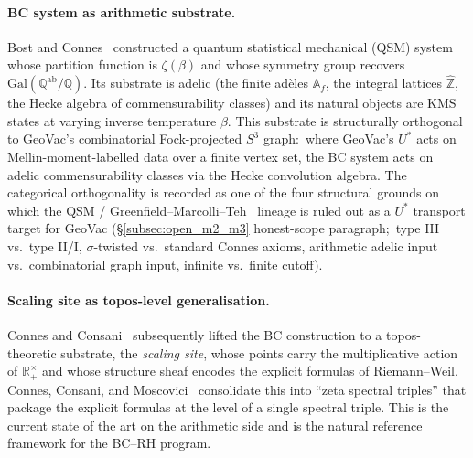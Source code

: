 \documentclass[11pt,a4paper]{article}
\theoremstyle{plain}
\theoremstyle{definition}
\newcommand{\sthree}{S^{3}}
\begin{document}
\paragraph{BC system as arithmetic substrate.}
Bost and Connes~\cite{bost_connes1995} constructed a quantum
statistical mechanical (QSM) system whose partition function is
$\zeta(\beta)$ and whose symmetry group recovers
$\mathrm{Gal}(\mathbb{Q}^{\mathrm{ab}}/\mathbb{Q})$.  Its substrate is
adelic (the finite ad\`eles $\mathbb{A}_f$, the integral lattices
$\widehat{\mathbb{Z}}$, the Hecke algebra of commensurability classes)
and its natural objects are KMS states at varying inverse temperature
$\beta$.  This substrate is structurally orthogonal to GeoVac's
combinatorial Fock-projected $\sthree$ graph:\ where GeoVac's $U^*$
acts on Mellin-moment-labelled data over a finite vertex set, the BC
system acts on adelic commensurability classes via the Hecke
convolution algebra.  The categorical orthogonality is recorded as
one of the four structural grounds on which the QSM /
Greenfield--Marcolli--Teh~\cite{greenfield_marcolli_teh2014} lineage
is ruled out as a $U^*$ transport target for GeoVac
(\S\ref{subsec:open_m2_m3} honest-scope paragraph;\ type III vs.\ type
II/I, $\sigma$-twisted vs.\ standard Connes axioms, arithmetic adelic
input vs.\ combinatorial graph input, infinite vs.\ finite cutoff).

\paragraph{Scaling site as topos-level generalisation.}
Connes and Consani~\cite{connes_consani2014_scaling,connes_consani2016_geometry}
subsequently lifted the BC construction to a topos-theoretic
substrate, the \emph{scaling site}, whose points carry the
multiplicative action of $\mathbb{R}_+^\times$ and whose structure
sheaf encodes the explicit formulas of Riemann--Weil.  Connes,
Consani, and Moscovici~\cite{connes_consani_moscovici2025_zeta}
consolidate this into ``zeta spectral triples'' that package the
explicit formulas at the level of a single spectral triple.  This is
the current state of the art on the arithmetic side and is the
natural reference framework for the BC--RH program.
\end{document}
